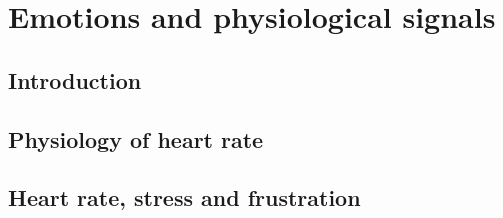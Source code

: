 \chapter{Emotions and physiological signals}

\section{Introduction}

\section{Physiology of heart rate}

\section{Heart rate, stress and frustration}
